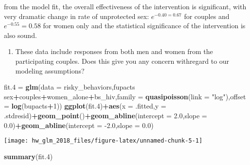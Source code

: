 \documentclass[]{article}
\newenvironment{Shaded}{\begin{snugshade}}{\end{snugshade}}
\newcommand{\DataTypeTok}[1]{\textcolor[rgb]{0.13,0.29,0.53}{#1}}
\newcommand{\DecValTok}[1]{\textcolor[rgb]{0.00,0.00,0.81}{#1}}
\newcommand{\FloatTok}[1]{\textcolor[rgb]{0.00,0.00,0.81}{#1}}
\newcommand{\KeywordTok}[1]{\textcolor[rgb]{0.13,0.29,0.53}{\textbf{#1}}}
\newcommand{\NormalTok}[1]{#1}
\newcommand{\OperatorTok}[1]{\textcolor[rgb]{0.81,0.36,0.00}{\textbf{#1}}}
\newcommand{\StringTok}[1]{\textcolor[rgb]{0.31,0.60,0.02}{#1}}
\providecommand{\tightlist}{%
  \setlength{\itemsep}{0pt}\setlength{\parskip}{0pt}}
\begin{document}
from the model fit, the overall effectiveness of the intervention is
significant, with very dramatic change in rate of unprotected sex:
\(e^{-0.40 = 0.67}\) for couples and \(e^{-0.55} = 0.58\) for women only
and the statistical significance of the intervention is also sound.

\begin{enumerate}
\def\labelenumi{\arabic{enumi}.}
\setcounter{enumi}{3}
\tightlist
\item
  These data include responses from both men and women from the
  participating couples. Does this give you any concern withregard to
  our modeling assumptions?
\end{enumerate}

\begin{Shaded}
\begin{Highlighting}[]
\NormalTok{fit}\FloatTok{.4}\NormalTok{ =}\StringTok{ }\KeywordTok{glm}\NormalTok{(}\DataTypeTok{data =}\NormalTok{ risky_behaviors,fupacts }\OperatorTok{~}\StringTok{ }\NormalTok{sex}\OperatorTok{+}\NormalTok{couples}\OperatorTok{+}\NormalTok{women_alone}\OperatorTok{+}\NormalTok{bs_hiv,}\DataTypeTok{family =} \KeywordTok{quasipoisson}\NormalTok{(}\DataTypeTok{link =} \StringTok{"log"}\NormalTok{),}\DataTypeTok{offset =} \KeywordTok{log}\NormalTok{(bupacts}\OperatorTok{+}\DecValTok{1}\NormalTok{))}
\KeywordTok{ggplot}\NormalTok{(fit}\FloatTok{.4}\NormalTok{)}\OperatorTok{+}\KeywordTok{aes}\NormalTok{(}\DataTypeTok{x =}\NormalTok{ .fitted,}\DataTypeTok{y =}\NormalTok{ .stdresid)}\OperatorTok{+}\KeywordTok{geom_point}\NormalTok{()}\OperatorTok{+}\KeywordTok{geom_abline}\NormalTok{(}\DataTypeTok{intercept =} \FloatTok{2.0}\NormalTok{,}\DataTypeTok{slope =} \FloatTok{0.0}\NormalTok{)}\OperatorTok{+}\KeywordTok{geom_abline}\NormalTok{(}\DataTypeTok{intercept =} \FloatTok{-2.0}\NormalTok{,}\DataTypeTok{slope =} \FloatTok{0.0}\NormalTok{)}
\end{Highlighting}
\end{Shaded}

\begin{center}\texttt{[image: hw\_glm\_2018\_files/figure-latex/unnamed-chunk-5-1]} \end{center}

\begin{Shaded}
\begin{Highlighting}[]
\KeywordTok{summary}\NormalTok{(fit}\FloatTok{.4}\NormalTok{)}
\end{Highlighting}
\end{Shaded}
\end{document}
